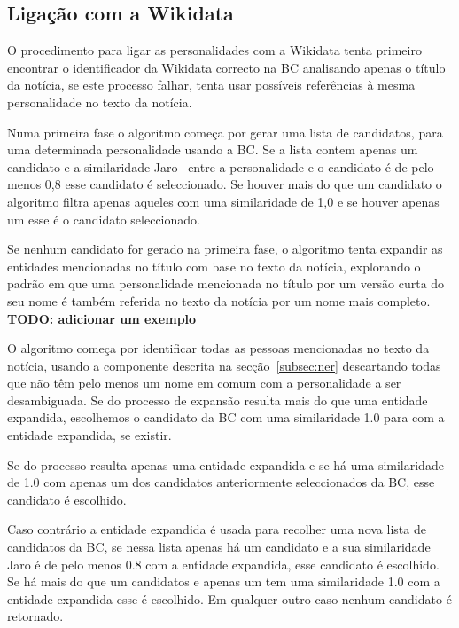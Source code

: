 \documentclass[a4paper, twocolumn, 11pt, twoside]{article}
\begin{document}
\subsection{Ligação com a Wikidata}
\label{subsec:ent_linking}

O procedimento para ligar as personalidades com a Wikidata tenta primeiro encontrar o identificador da Wikidata correcto na BC analisando apenas o título da notícia, se este processo falhar, tenta usar possíveis referências à mesma personalidade no texto da notícia.

Numa primeira fase o algoritmo começa por gerar uma lista de candidatos, para uma determinada personalidade usando a BC. Se a lista contem apenas um candidato e a similaridade Jaro~\citep{jaro1989} entre a personalidade e o candidato é de pelo menos 0,8 esse candidato é seleccionado. Se houver mais do que um candidato o algoritmo filtra apenas aqueles com uma similaridade de 1,0 e se houver apenas um esse é o candidato seleccionado. 

Se nenhum candidato for gerado na primeira fase, o algoritmo tenta expandir as entidades mencionadas no título com base no texto da notícia, explorando o padrão em que uma personalidade mencionada no título por um versão curta do seu nome é também referida no texto da notícia por um nome mais completo. \textbf{TODO: adicionar um exemplo}

O algoritmo começa por identificar todas as pessoas mencionadas no texto da notícia, usando a componente descrita na secção~\ref{subsec:ner} descartando todas que não têm pelo menos um nome em comum com a personalidade a ser desambiguada.  Se do processo de expansão resulta mais do que uma entidade expandida, escolhemos o candidato da BC  com uma similaridade 1.0 para com a entidade expandida, se existir. 

Se do processo resulta apenas uma entidade expandida e se há uma similaridade de 1.0 com apenas um dos candidatos anteriormente seleccionados da BC, esse candidato é escolhido. 

Caso contrário a entidade expandida é usada para recolher uma nova lista de candidatos da BC, se nessa lista apenas há um candidato e a sua similaridade Jaro é de pelo menos 0.8 com a entidade expandida, esse candidato é escolhido. Se há mais do que um candidatos e apenas um tem uma similaridade 1.0 com a entidade expandida esse é escolhido. Em qualquer outro caso nenhum candidato é retornado.

\end{document}

